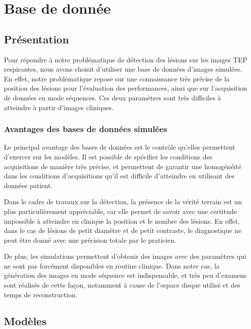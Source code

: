 \chapter{Base de donnée}
	\label{lab:bdd}

\section{Présentation}

Pour répondre à notre problématique de détection des lésions sur les images TEP respirantes, nous avons choisit d’utiliser une base de données d’images simulées. En effet, notre problématique repose sur une connaissance très précise de la position des lésions pour l’évaluation des performances, ainsi que sur l’acquisition de données en mode séquences. Ces deux paramètres sont très difficiles à atteindre à partir d’images cliniques.

	\subsection{Avantages des bases de données simulées}

Le principal avantage des bases de données est le contrôle qu'elles permettent d'exercer sur les modèles. Il est possible de spécifier les conditions des acquisitions de manière très précise, et permettent de garantir une homogénéité dans les conditions d'acquisitions qu'il est difficile d'atteindre en utilisant des données patient.

Dans le cadre de travaux sur la détection, la présence de la vérité terrain est un plus particulièrement appréciable, car elle permet de savoir avec une certitude impossible à atteindre en clinique la position  et le nombre des lésions. En effet, dans le cas de lésions de petit diamètre et de petit contraste, le diagnostique ne peut être donné avec une précision totale par le praticien. 

De plus, les simulations permettent d’obtenir des images avec des paramètres qui ne sont pas forcément disponibles en routine clinique. Dans notre cas, la génération des images en mode séquence est indispensable, et très peu d’examens sont réalisés de cette façon, notamment à cause de l’espace disque utilisé et des temps de reconstruction.

	\section{Modèles}

